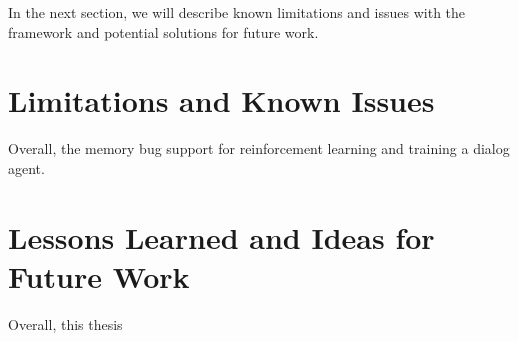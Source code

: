 In the next section, we will describe known limitations and issues with the framework and potential solutions for future work. 

\section{Limitations and Known Issues}
\label{sec:issues} 

Overall, the 
memory bug
support for reinforcement learning and training a dialog agent. 


\section{Lessons Learned and Ideas for Future Work}
\label{sec:lessons}
Overall, this thesis 



